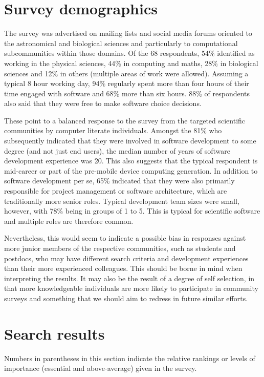 \documentclass{casicswhitepaper}
\begin{document}
\section{Survey demographics}

The survey was advertised on mailing lists and social media forums oriented to the astronomical and biological sciences and particularly to computational subcommunities within those domains. Of the 68 respondents, 54\% identified as working in the physical sciences, 44\% in computing and maths, 28\% in biological sciences and 12\% in others (multiple areas of work were allowed). Assuming a typical 8 hour working day, 94\% regularly spent more than four hours of their time engaged with software and 68\% more than six hours. 88\% of respondents also said that they were free to make software choice decisions. 

These point to a balanced response to the survey from the targeted scientific communities by computer literate individuals. Amongst the 81\% who subsequently indicated that they were involved in software development to some degree (and not just end users), the median number of years of software development experience was 20. This also suggests that the typical respondent is mid-career or part of the pre-mobile device computing generation. In addition to software development per se, 65\% indicated that they were also primarily responsible for project management or software architecture, which are traditionally more senior roles. Typical development team sizes were small, however, with 78\% being in groups of 1 to 5. This is typical for scientific software and multiple roles are therefore common.  

Nevertheless, this would seem to indicate a possible bias in responses against more junior members of the respective communities, such as students and postdocs, who may have different search criteria and development experiences than their more experienced colleagues. This should be borne in mind when interpreting the results. It may also be the result of a degree of self selection, in that more knowledgeable individuals are more likely to participate in community surveys and something that we should aim to redress in future similar efforts.

\section{Search results}

Numbers in parentheses in this section indicate the relative rankings or levels of importance (essential and above-average) given in the survey.
\end{document}
